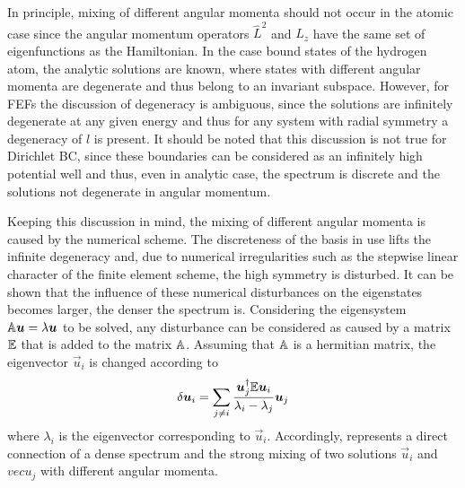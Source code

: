 In principle, mixing of different angular momenta should not occur in the atomic case since the angular momentum operators $\hat{L}^2$ and $\hat{L}_z$ have the same set of eigenfunctions as the Hamiltonian.
In the case bound states of the hydrogen atom, the analytic solutions are known, where states with different angular momenta are degenerate and thus belong to an invariant subspace.
However, for FEFs the discussion of degeneracy is ambiguous, since the solutions are infinitely degenerate at any given energy and thus for any system with radial symmetry a degeneracy of $l$ is present.
It should be noted that this discussion is not true for Dirichlet BC, since these boundaries can be considered as an infinitely high potential well and thus, even in analytic case, the spectrum is discrete and the solutions not degenerate in angular momentum.

Keeping this discussion in mind, the mixing of different angular momenta is caused by the numerical scheme.
The discreteness of the basis in use lifts the infinite degeneracy and, due to numerical irregularities such as the stepwise linear character of the finite element scheme, the high symmetry is disturbed.
It can be shown that the influence of these numerical disturbances on the eigenstates becomes larger, the denser the spectrum is.
Considering the eigensystem $\mathbb{A}\bm{u}=\lambda\bm{u}$ to be solved, any disturbance can be considered as caused by a matrix $\mathbb{E}$ that is added to the matrix $\mathbb{A}$.
Assuming that $\mathbb{A}$ is a hermitian matrix, the eigenvector $\vec{u}_i$ is changed according to \cite{saad, wilkinson}
\begin{equation}\label{eq:ErrVect}
\delta \bm{u}_i=\sum_{j\neq i} \frac{\bm{u}_j^\dagger\mathbb{E}\bm{u}_i}{\lambda_i-\lambda_j} \bm{u}_j
\end{equation}
where $\lambda_i$ is the eigenvector corresponding to $\vec{u}_i$.
Accordingly,  represents a direct connection of a dense spectrum and the strong mixing of two solutions $\vec{u}_i$ and $vec{u}_j$ with different angular momenta.

